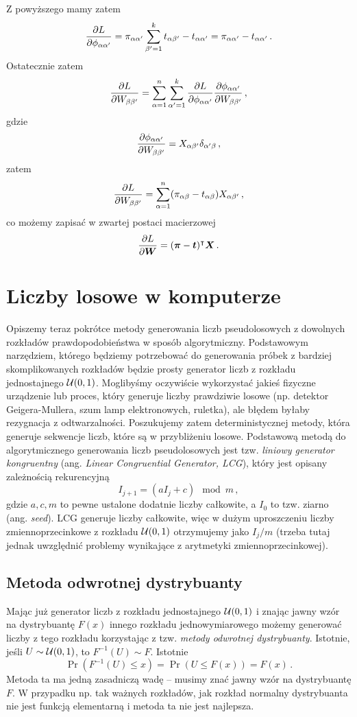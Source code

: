 \documentclass{myclass}
\begin{document}
Z powyższego mamy zatem
\[
    \pdv{L}{\phi_{\alpha\alpha'}} = \pi_{\alpha\alpha'} \sum_{\beta'=1}^k t_{\alpha\beta'} - t_{\alpha\alpha'} = \pi_{\alpha\alpha'} - t_{\alpha\alpha'}\,.
\]
Ostatecznie zatem
\[
    \pdv{L}{W_{\beta\beta'}} = \sum_{\alpha=1}^n \sum_{\alpha'=1}^k \pdv{L}{\phi_{\alpha\alpha'}} \pdv{\phi_{\alpha\alpha'}}{W_{\beta\beta'}}\,,
\]
gdzie
\[
    \pdv{\phi_{\alpha\alpha'}}{W_{\beta\beta'}} = X_{\alpha\beta'} \delta_{\alpha'\beta}\,,
\]
zatem
\[
    \pdv{L}{W_{\beta\beta'}} = \sum_{\alpha=1}^n (\pi_{\alpha\beta} - t_{\alpha\beta}) X_{\alpha\beta'}\,,
\]
co możemy zapisać w zwartej postaci macierzowej
\[
    \pdv{L}{\bm{W}} = (\bm{\pi} - \bm{t})^\intercal \bm{X}\,.
\]

\section{Liczby losowe w komputerze}

Opiszemy teraz pokrótce metody generowania liczb pseudolosowych z dowolnych rozkładów
prawdopodobieństwa w sposób algorytmiczny. Podstawowym narzędziem, którego będziemy potrzebować do
generowania próbek z bardziej skomplikowanych rozkładów będzie prosty generator liczb z rozkładu
jednostajnego \(\mathcal{U}(0,1)\). Moglibyśmy oczywiście wykorzystać jakieś fizyczne urządzenie lub
proces, który generuje liczby prawdziwie losowe (np. detektor Geigera-Mullera, szum lamp
elektronowych, ruletka), ale błędem byłaby rezygnacja z odtwarzalności. Poszukujemy zatem
deterministycznej metody, która generuje sekwencje liczb, które są w przybliżeniu losowe. Podstawową
metodą do algorytmicznego generowania liczb pseudolosowych jest tzw. \emph{liniowy generator
kongruentny} (ang. \emph{Linear Congruential Generator, LCG}), który jest opisany zależnością
rekurencyjną
\[
I_{j+1} = (a I_j + c) \mod m\,,
\]
gdzie \(a, c, m\) to pewne ustalone dodatnie liczby całkowite, a \(I_0\) to tzw. ziarno (ang.
\emph{seed}). LCG generuje liczby całkowite, więc w dużym uproszczeniu liczby zmiennoprzecinkowe z
rozkładu \(\mathcal{U}(0,1)\) otrzymujemy jako \(I_j / m\) (trzeba tutaj jednak uwzględnić problemy
wynikające z arytmetyki zmiennoprzecinkowej).

\subsection{Metoda odwrotnej dystrybuanty}

Mając już generator liczb z rozkładu jednostajnego \(\mathcal{U}(0,1)\) i znając jawny wzór na
dystrybuantę \(F(x)\) innego rozkładu jednowymiarowego możemy generować liczby z tego rozkładu
korzystając z tzw. \emph{metody odwrotnej dystrybuanty}. Istotnie, jeśli \(U \sim \mathcal{U}(0,1)\), to
\(F^{-1}(U) \sim F\). Istotnie
\[
\Pr(F^{-1}(U) \leq x) = \Pr(U \leq F(x)) = F(x)\,.
\]
Metoda ta ma jedną zasadniczą wadę -- musimy znać jawny wzór na dystrybuantę \(F\). W przypadku np.
tak ważnych rozkładów, jak rozkład normalny dystrybuanta nie jest funkcją elementarną i metoda ta
nie jest najlepsza.
\end{document}
